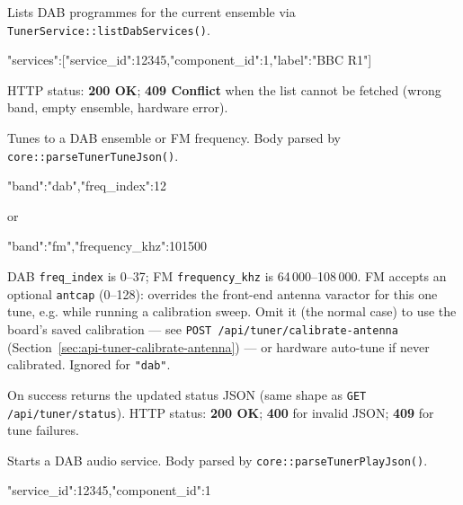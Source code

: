 \label{sec:api-tuner-services}

Lists DAB programmes for the current ensemble via
\texttt{TunerService::listDabServices()}.

\begin{drnote}
\begin{drcode}[JSON]
{"services":[{"service_id":12345,"component_id":1,"label":"BBC R1"}]}
\end{drcode}
\end{drnote}

HTTP status: \textbf{200 OK}; \textbf{409 Conflict} when the list cannot be
fetched (wrong band, empty ensemble, hardware error).

\label{sec:api-tuner-tune}

Tunes to a DAB ensemble or FM frequency. Body parsed by
\texttt{core::parseTunerTuneJson()}.

\begin{drnote}
\begin{drcode}[JSON]
{"band":"dab","freq_index":12}
\end{drcode}
or
\begin{drcode}[JSON]
{"band":"fm","frequency_khz":101500}
\end{drcode}
DAB \texttt{freq\_index} is 0--37; FM \texttt{frequency\_khz} is
64\,000--108\,000. FM accepts an optional \texttt{antcap} (0--128):
overrides the front-end antenna varactor for this one tune, e.g. while
running a calibration sweep. Omit it (the normal case) to use the board's
saved calibration --- see
\texttt{POST /api/tuner/calibrate-antenna}
(Section~\ref{sec:api-tuner-calibrate-antenna}) --- or hardware auto-tune
if never calibrated. Ignored for \texttt{"dab"}.
\end{drnote}

On success returns the updated status JSON (same shape as
\texttt{GET /api/tuner/status}). HTTP status: \textbf{200 OK};
\textbf{400} for invalid JSON; \textbf{409} for tune failures.

\label{sec:api-tuner-play}

Starts a DAB audio service. Body parsed by
\texttt{core::parseTunerPlayJson()}.

\begin{drnote}
\begin{drcode}[JSON]
{"service_id":12345,"component_id":1}
\end{drcode}
\end{drnote}

